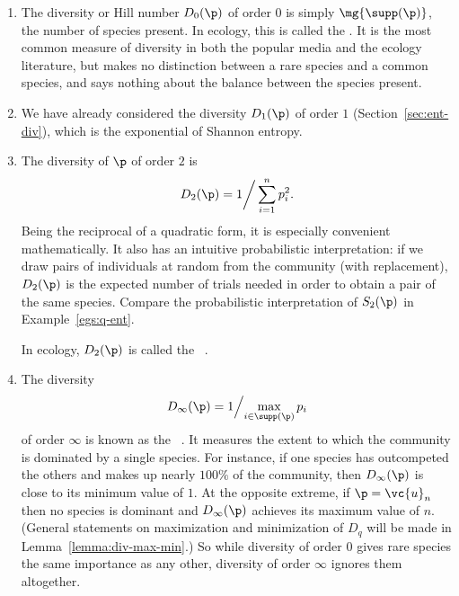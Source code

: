 \begin{examples}
\begin{enumerate}
\item 
{}
The diversity or Hill number $D_0(\p)$ of order $0$ is simply
$\mg{\supp(\p)}$, the number of species present.  In ecology, this is
called the .  It is the most common measure of diversity in both the popular
media and the ecology literature, but makes no distinction between a rare
species and a common species, and says nothing about the balance between
the species present.

\item
We have already considered the diversity $D_1(\p)$ of order $1$
(Section~\ref{sec:ent-div}), which is the exponential of Shannon entropy.

\item
{}
The diversity of $\p$ of order $2$ is 
\[
D_2(\p) = 1\bigg/\sum_{i = 1}^n p_i^2.
\]
Being the reciprocal of a quadratic form, it is especially convenient
mathematically.  It also has an intuitive probabilistic interpretation: if
we draw pairs of individuals at random from the community (with
replacement), $D_2(\p)$ is the expected number of trials needed in order to
obtain a pair of the same species.  Compare the probabilistic
interpretation of $S_2(\p)$ in Example~\ref{egs:q-ent}.

In ecology, $D_2(\p)$ is called the ~\cite{SimpMD}.

\item
{}
The diversity 
\[
D_\infty(\p) 
=
1\Big/\!\max_{i \in \supp(\p)} p_i
\]
of order $\infty$ is known as the
~\cite{BePa}.  It measures the extent to which the community is
dominated by a single species.  For instance, if one species has
outcompeted the others and makes up nearly $100\%$ of the community, then
$D_\infty(\p)$ is close to its minimum value of $1$.  At the opposite
extreme, if $\p = \vc{u}_n$ then no species is dominant and $D_\infty(\p)$
achieves its maximum value of $n$.  (General statements on maximization and
minimization of $D_q$ will be made in Lemma~\ref{lemma:div-max-min}.)
So while diversity of order $0$ gives rare species the same importance as
any other, diversity of order $\infty$ ignores them altogether.
\end{enumerate}
\end{examples}

